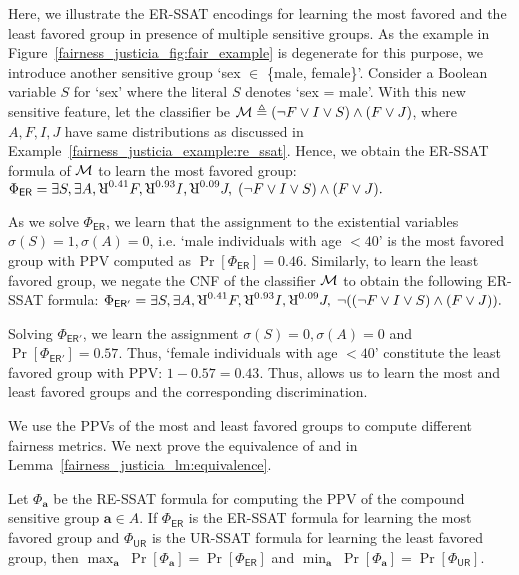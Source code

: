 \begin{example}
	\label{fairness_justicia_example:er_ssat}
	Here, we illustrate the ER-SSAT encodings for learning the most favored and the least favored group in presence of multiple sensitive groups. As the example in Figure~\ref{fairness_justicia_fig:fair_example} is degenerate for this purpose, we introduce another sensitive group `sex $ \in $ \{male, female\}'. Consider a Boolean variable $ S $ for `sex' where the literal $ S $ denotes `sex = male'. With this new sensitive feature, let the classifier be  $\mathcal{M} \triangleq (\neg F \vee I \vee S) \wedge (F \vee J)$, where $ A,F,I,J $ have same distributions as discussed in Example~\ref{fairness_justicia_example:re_ssat}. 
	Hence, we obtain the ER-SSAT formula of $\mathcal{M}$ to learn the most favored group:
	$ \Phi_{\mathsf{ER}} =  \exists S,\exists A, \R^{0.41}F, \R^{0.93}I, \R^{0.09}J, \; (\neg F \vee I \vee S) \wedge (F \vee J).
	$
	
	As we solve $ \Phi_{\mathsf{ER}} $, we learn that the assignment to the existential variables $ \sigma(S) = 1, \sigma(A) = 0$, i.e. `male individuals with age $ < 40 $' is the most favored group with PPV computed as $ \Pr[\Phi_{\mathsf{ER}}] = 0.46$. Similarly, to learn the least favored group, we negate the CNF of the classifier $\mathcal{M}$ to obtain the following ER-SSAT formula:
	$	\Phi_{\mathsf{ER'}} =  \exists S, \exists A, \R^{0.41}F, \R^{0.93}I, \R^{0.09}J, \; \neg((\neg F \vee I \vee S) \wedge (F \vee J)).
	$
	
	Solving $ \Phi_{\mathsf{ER'}} $, we learn the assignment $ \sigma(S) = 0, \sigma(A) = 0  $ and $  \Pr[\Phi_{\mathsf{ER'}}] = 0.57 $. Thus, `female individuals with age $ < 40 $' constitute the least favored group with PPV:  $ 1-0.57 = 0.43$. 
	Thus, {\justicialearn} allows us to learn the most and least favored groups and the corresponding discrimination.
\end{example}
We use the PPVs of the most and least favored groups to compute different fairness metrics. We next prove the equivalence of {\justiciaenum} and {\justicialearn} in Lemma~\ref{fairness_justicia_lm:equivalence}.
\begin{lemma}
	\label{fairness_justicia_lm:equivalence}
	Let $ \Phi_{\mathbf{a}} $ be the RE-SSAT formula for computing the PPV of the compound sensitive group $ \mathbf{a} \in A $. If $ \Phi_{\mathsf{ER}} $ is the ER-SSAT formula for learning the most favored group and $ \Phi_{\mathsf{UR}} $ is the UR-SSAT formula for learning the least favored group, then
	$\max_{\mathbf{a}} \; \Pr[\Phi_{\mathbf{a}}] = \Pr[\Phi_{\mathsf{ER}}]$   
	and
	$\min_{\mathbf{a}} \; \Pr[\Phi_{\mathbf{a}}] = \Pr[\Phi_{\mathsf{UR}}]$.   
\end{lemma}
